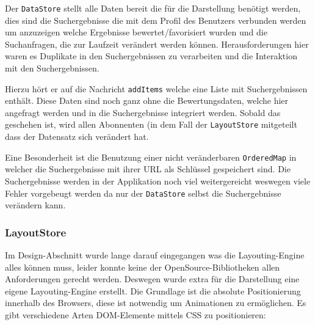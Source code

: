 \documentclass[12pt,twoside]{book}
\begin{document}
Der \texttt{DataStore} stellt alle Daten bereit die für die Darstellung benötigt werden, dies sind die Suchergebnisse die mit dem Profil des Benutzers verbunden werden um anzuzeigen welche Ergebnisse bewertet/favorisiert wurden und die Suchanfragen, die zur Laufzeit verändert werden können. Herausforderungen hier waren es Duplikate in den Suchergebnissen zu verarbeiten und die Interaktion mit den Suchergebnissen.

Hierzu hört er auf die Nachricht \texttt{addItems} welche eine Liste mit Suchergebnissen enthält. Diese Daten sind noch ganz ohne die Bewertungsdaten, welche hier angefragt werden und in die Suchergebnisse integriert werden. Sobald das geschehen ist, wird allen Abonnenten (in dem Fall der \texttt{LayoutStore} mitgeteilt dass der Datensatz sich verändert hat.

Eine Besonderheit ist die Benutzung einer nicht veränderbaren \texttt{OrderedMap} in welcher die Suchergebnisse mit ihrer URL als Schlüssel gespeichert sind. Die Suchergebnisse werden in der Applikation noch viel weitergereicht weswegen viele Fehler vorgebeugt werden da nur der \texttt{DataStore} selbst die Suchergebnisse verändern kann.

\subsubsection{LayoutStore}

Im Design-Abschnitt wurde lange darauf eingegangen was die Layouting-Engine alles können muss, leider konnte keine der OpenSource-Bibliotheken allen Anforderungen gerecht werden. Deswegen wurde extra für die Darstellung eine eigene Layouting-Engine erstellt.
Die Grundlage ist die absolute Positionierung innerhalb des Browsers, diese ist notwendig um Animationen zu ermöglichen. Es gibt verschiedene Arten DOM-Elemente mittels CSS zu positionieren:
\end{document}
